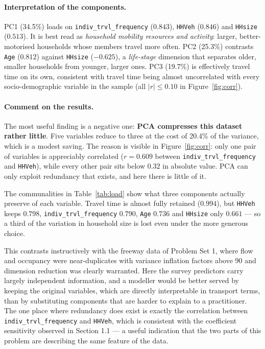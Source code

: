 \documentclass[11pt,a4paper]{article}
\newcommand{\code}[1]{\texttt{#1}}
\begin{document}
\paragraph{Interpretation of the components.} PC1 (34.5\%) loads on
\code{indiv\_trvl\_frequency} ($0.843$), \code{HHVeh} ($0.846$) and \code{HHsize}
($0.513$). It is best read as \emph{household mobility resources and activity}: larger,
better-motorised households whose members travel more often. PC2 (25.3\%) contrasts
\code{Age} ($0.812$) against \code{HHsize} ($-0.625$), a \emph{life-stage} dimension that
separates older, smaller households from younger, larger ones. PC3 (19.7\%) is effectively
travel time on its own, consistent with travel time being almost uncorrelated with every
socio-demographic variable in the sample (all $|r| \le 0.10$ in Figure~\ref{fig:corr}).

\paragraph{Comment on the results.} The most useful finding is a negative one:
\textbf{PCA compresses this dataset rather little}. Five variables reduce to three at the
cost of 20.4\% of the variance, which is a modest saving. The reason is visible in
Figure~\ref{fig:corr}: only one pair of variables is appreciably correlated
($r = 0.609$ between \code{indiv\_trvl\_frequency} and \code{HHVeh}), while every other
pair sits below $0.32$ in absolute value. PCA can only exploit redundancy that exists, and
here there is little of it.

The communalities in Table~\ref{tab:load} show what three components actually preserve of
each variable. Travel time is almost fully retained ($0.994$), but \code{HHVeh} keeps
$0.798$, \code{indiv\_trvl\_frequency} $0.790$, \code{Age} $0.736$ and \code{HHsize} only
$0.661$ --- so a third of the variation in household size is lost even under the more
generous choice.

This contrasts instructively with the freeway data of Problem Set 1, where flow and
occupancy were near-duplicates with variance inflation factors above 90 and dimension
reduction was clearly warranted. Here the survey predictors carry largely independent
information, and a modeller would be better served by keeping the original variables, which
are directly interpretable in transport terms, than by substituting components that are
harder to explain to a practitioner. The one place where redundancy does exist is exactly
the correlation between \code{indiv\_trvl\_frequency} and \code{HHVeh}, which is consistent
with the coefficient sensitivity observed in Section 1.1 --- a useful indication that the
two parts of this problem are describing the same feature of the data.
\end{document}
